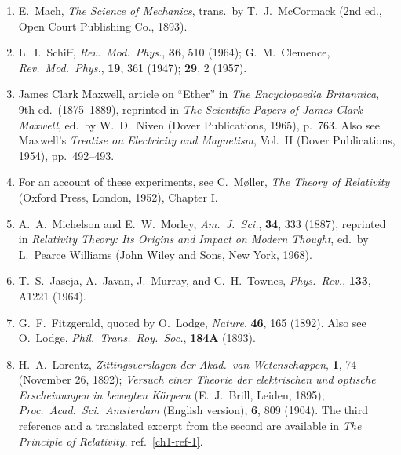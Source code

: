\begin{enumerate}
  \item {}\label{ch1-ref-19}
  E.\ Mach, \emph{The Science of Mechanics}, trans.\ by T.\ J.\ McCormack
  (2nd ed., Open Court Publishing Co., 1893).

  \item {}\label{ch1-ref-20}
  L.\ I.\ Schiff, \emph{Rev.\ Mod.\ Phys.}, \textbf{36}, 510 (1964);
  G.\ M.\ Clemence, \emph{Rev.\ Mod.\ Phys.}, \textbf{19}, 361 (1947);
  \textbf{29}, 2 (1957).

  \item {}\label{ch1-ref-21}
  James Clark Maxwell, article on ``Ether'' in \emph{The Encyclopaedia
  Britannica}, 9th ed.\ (1875--1889), reprinted in \emph{The Scientific
  Papers of James Clark Maxwell}, ed.\ by W.\ D.\ Niven (Dover Publications,
  1965), p.\ 763. Also see Maxwell's \emph{Treatise on Electricity and
  Magnetism}, Vol.\ II (Dover Publications, 1954), pp.\ 492--493.

  \item {}\label{ch1-ref-22}
  For an account of these experiments, see C.\ M{\o}ller, \emph{The Theory of
  Relativity} (Oxford Press, London, 1952), Chapter I.

  \item {}\label{ch1-ref-23}
  A.\ A.\ Michelson and E.\ W.\ Morley, \emph{Am.\ J.\ Sci.}, \textbf{34},
  333 (1887), reprinted in \emph{Relativity Theory: Its Origins and Impact on
  Modern Thought}, ed.\ by L.\ Pearce Williams (John Wiley and Sons, New York,
  1968).

  \item {}\label{ch1-ref-24}
  T.\ S.\ Jaseja, A.\ Javan, J.\ Murray, and C.\ H.\ Townes, \emph{Phys.\
  Rev.}, \textbf{133}, A1221 (1964).

  \item {}\label{ch1-ref-25}
  G.\ F.\ Fitzgerald, quoted by O.\ Lodge, \emph{Nature}, \textbf{46}, 165
  (1892). Also see O.\ Lodge, \emph{Phil.\ Trans.\ Roy.\ Soc.},
  \textbf{184A} (1893).

  \item {}\label{ch1-ref-26}
  H.\ A.\ Lorentz, \emph{Zittingsverslagen der Akad.\ van Wetenschappen},
  \textbf{1}, 74 (November 26, 1892); \emph{Versuch einer Theorie der
  elektrischen und optische Erscheinungen in bewegten K\"orpern} (E.\ J.\
  Brill, Leiden, 1895); \emph{Proc.\ Acad.\ Sci.\ Amsterdam} (English
  version), \textbf{6}, 809 (1904). The third reference and a translated
  excerpt from the second are available in \emph{The Principle of
  Relativity}, ref.~\ref{ch1-ref-1}.


\end{enumerate}
